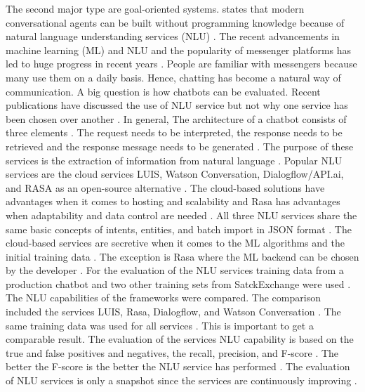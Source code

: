 The second major type are goal-oriented systems.
\citet{braunEvaluatingNLU} states that modern conversational agents can be built without programming 
knowledge because of natural language understanding services (NLU) \cite{braunEvaluatingNLU}. 
The recent advancements in machine learning (ML) and NLU and the popularity of messenger platforms 
has led to huge progress in recent years \cite{braunEvaluatingNLU}. 
People are familiar with messengers because many use them on a daily basis.
Hence, chatting has become a natural way of communication.
A big question is how chatbots can be evaluated.
Recent publications have discussed the use of NLU service but not why 
one service has been chosen over another \cite{braunEvaluatingNLU}.
In general, The architecture of a chatbot consists of three elements \cite{braunEvaluatingNLU}. 
The request needs to be interpreted, the response needs to be retrieved and the response message
needs to be generated \cite{braunEvaluatingNLU}. 
The purpose of these services is the extraction of information from natural language \cite{braunEvaluatingNLU}. 
Popular NLU services are the cloud services LUIS, Watson Conversation, Dialogflow/API.ai, and RASA as an open-source alternative \cite{braunEvaluatingNLU}. 
The cloud-based solutions have advantages when it comes to hosting and scalability and Rasa has advantages
when adaptability and data control are needed \cite{braunEvaluatingNLU}. 
All three NLU services share the same basic concepts of intents, entities, and batch import in JSON format \cite{braunEvaluatingNLU}.
The cloud-based services are secretive when it comes to the ML algorithms and the initial training data \cite{braunEvaluatingNLU}. 
The exception is Rasa where the ML backend can be chosen by the developer \cite{braunEvaluatingNLU}. 
For the evaluation of the NLU services training data from a production chatbot and two other training sets 
from SatckExchange were used \cite{braunEvaluatingNLU}. 
The NLU capabilities of the frameworks were compared.
The comparison included the services LUIS, Rasa, Dialogflow, and Watson Conversation \cite{braunEvaluatingNLU}. 
The same training data was used for all services \cite{braunEvaluatingNLU}. 
This is important to get a comparable result.
The evaluation of the services NLU capability is based on the true and false positives and negatives, 
the recall, precision, and F-score \cite{braunEvaluatingNLU}. 
The better the F-score is the better the NLU service has performed \cite{braunEvaluatingNLU}. 
The evaluation of NLU services is only a snapshot since the services are continuously improving \cite{braunEvaluatingNLU}. 
